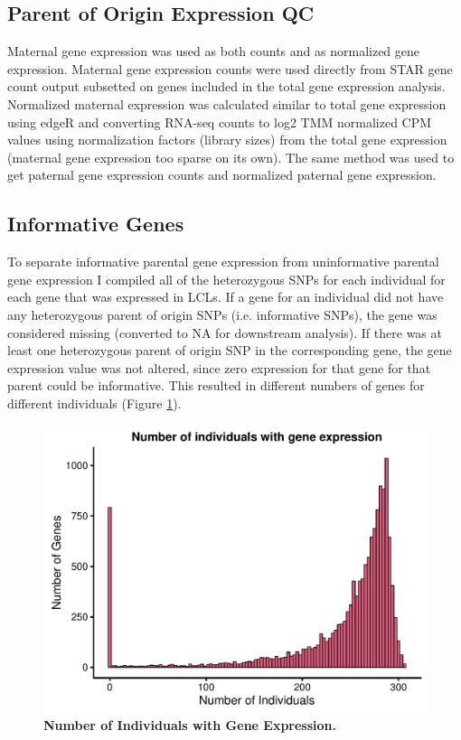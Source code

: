 \subsection{Parent of Origin Expression QC}\label{Parent of Origin Expression QC}
Maternal gene expression was used as both counts and as normalized gene expression. Maternal gene expression counts were used directly from STAR gene count output\cite{Dobin:2002by} subsetted on genes included in the total gene expression analysis. 
Normalized maternal expression was calculated similar to total gene expression using edgeR and converting RNA-seq counts to log2 TMM normalized CPM values using normalization factors (library sizes) from the total gene expression (maternal gene expression too sparse on its own). The same method was used to get paternal gene expression counts and normalized paternal gene expression.

\subsection{Informative Genes}\label{Informative Genes}
To separate informative parental gene expression from uninformative parental gene expression I compiled all of the heterozygous SNPs for each individual for each gene that was expressed in LCLs. If a gene for an individual did not have any heterozygous parent of origin SNPs (i.e. informative SNPs), the gene was considered missing (converted to NA for downstream analysis). If there was at least one heterozygous parent of origin SNP in the corresponding gene, the gene expression value was not altered, since zero expression for that gene for that parent could be informative. This resulted in different numbers of genes for different individuals (Figure \ref{fig:indspergene}).

\begin{figure}[!htb]
\centering \includegraphics[width=5in]{img/ch04/fig-08-individualspergene.pdf}
\caption[Number of Individuals with Gene Expression.]{\textbf{Number of Individuals with Gene Expression.} }
\label{fig:indspergene}
\end{figure}
\clearpage


